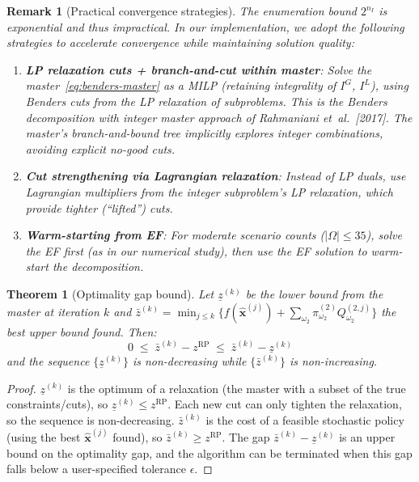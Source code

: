 \documentclass[11pt]{article}
\newtheorem{theorem}{Theorem}
\newtheorem{remark}{Remark}
\begin{document}
\begin{remark}[Practical convergence strategies]\label{rem:practical}
The enumeration bound $2^{n_I}$ is exponential and thus impractical.
In our implementation, we adopt the following strategies to accelerate
convergence while maintaining solution quality:
\begin{enumerate}[nosep]
  \item \textbf{LP relaxation cuts + branch-and-cut within master}:
    Solve the master~\eqref{eq:benders-master} as a MILP (retaining
    integrality of $I^G$, $I^L$), using Benders cuts from the LP
    relaxation of subproblems. This is the \emph{Benders
    decomposition with integer master} approach of Rahmaniani
    et~al.~[2017]. The master's branch-and-bound tree implicitly
    explores integer combinations, avoiding explicit no-good cuts.
  \item \textbf{Cut strengthening via Lagrangian relaxation}:
    Instead of LP duals, use Lagrangian multipliers from the integer
    subproblem's LP relaxation, which provide tighter (``lifted'')
    cuts.
  \item \textbf{Warm-starting from EF}: For moderate scenario counts
    ($|\Omega| \leq 35$), solve the EF first (as in our numerical
    study), then use the EF solution to warm-start the
    decomposition.
\end{enumerate}
\end{remark}

\begin{theorem}[Optimality gap bound]\label{thm:gap}
Let $\underline{z}^{(k)}$ be the lower bound from the master
at iteration $k$ and $\bar{z}^{(k)} = \min_{j \leq k}\{
f(\hat{\mathbf{x}}^{(j)}) + \sum_{\omega_2}
\pi^{(2)}_{\omega_2} Q^{(2,j)}_{\omega_2}\}$ the best upper bound
found. Then:
\begin{equation}\label{eq:gap-bound}
  0 \;\leq\; \bar{z}^{(k)} - z^{\mathrm{RP}}
  \;\leq\; \bar{z}^{(k)} - \underline{z}^{(k)}
\end{equation}
and the sequence $\{\underline{z}^{(k)}\}$ is non-decreasing while
$\{\bar{z}^{(k)}\}$ is non-increasing.
\end{theorem}

\begin{proof}
$\underline{z}^{(k)}$ is the optimum of a relaxation (the master
with a subset of the true constraints/cuts), so
$\underline{z}^{(k)} \leq z^{\mathrm{RP}}$. Each new cut can only
tighten the relaxation, so the sequence is non-decreasing.
$\bar{z}^{(k)}$ is the cost of a feasible stochastic policy
(using the best $\hat{\mathbf{x}}^{(j)}$ found), so
$\bar{z}^{(k)} \geq z^{\mathrm{RP}}$. The gap
$\bar{z}^{(k)} - \underline{z}^{(k)}$ is an upper bound on the
optimality gap, and the algorithm can be terminated when this gap
falls below a user-specified tolerance $\epsilon$.
\end{proof}
\end{document}
